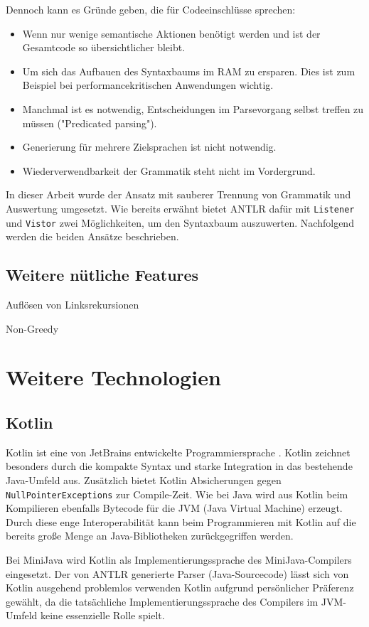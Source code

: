 Dennoch kann es Gründe geben, die für Codeeinschlüsse sprechen:
\begin{itemize}
    \item Wenn nur wenige semantische Aktionen benötigt werden und ist der Gesamtcode so übersichtlicher bleibt.
    \item Um sich das Aufbauen des Syntaxbaums im RAM zu ersparen. Dies ist zum Beispiel bei performancekritischen Anwendungen wichtig.
    \item Manchmal ist es notwendig, Entscheidungen im Parsevorgang selbst treffen zu müssen ("Predicated parsing").
    \item Generierung für mehrere Zielsprachen ist nicht notwendig.
    \item Wiederverwendbarkeit der Grammatik steht nicht im Vordergrund.
\end{itemize}

In dieser Arbeit wurde der Ansatz mit sauberer Trennung von Grammatik und Auswertung umgesetzt. Wie bereits erwähnt bietet ANTLR dafür mit \lstinline{Listener} und \lstinline{Vistor} zwei Möglichkeiten, um den Syntaxbaum auszuwerten. Nachfolgend werden die beiden Ansätze beschrieben.

\subsection{Weitere nütliche Features}

Auflösen von Linksrekursionen

Non-Greedy

\section{Weitere Technologien}
\subsection{Kotlin}
Kotlin ist eine von JetBrains entwickelte Programmiersprache \cite{KotlinReference}. Kotlin zeichnet besonders durch die kompakte Syntax und starke Integration in das bestehende Java-Umfeld aus. Zusätzlich bietet Kotlin Absicherungen gegen \lstinline{NullPointerExceptions} zur Compile-Zeit. Wie bei Java wird aus Kotlin beim Kompilieren ebenfalls Bytecode für die JVM (Java Virtual Machine) erzeugt. Durch diese enge Interoperabilität kann beim Programmieren mit Kotlin auf die bereits große Menge an Java-Bibliotheken zurückgegriffen werden.

Bei MiniJava wird Kotlin als Implementierungssprache des MiniJava-Compilers eingesetzt. Der von ANTLR generierte Parser (Java-Sourcecode) lässt sich von Kotlin ausgehend problemlos verwenden Kotlin aufgrund persönlicher Präferenz gewählt, da die tatsächliche Implementierungssprache des Compilers im JVM-Umfeld keine essenzielle Rolle spielt.

